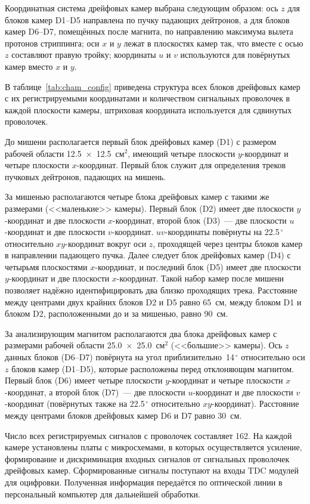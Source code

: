 Координатная система дрейфовых камер выбрана следующим образом: ось $z$ для
блоков камер D1--D5 направлена по пучку падающих дейтронов, а для блоков камер
D6--D7, помещённых после магнита, по направлению максимума вылета протонов
стриппинга; оси $x$ и $y$ лежат в плоскостях камер так, что вместе с осью $z$
составляют правую тройку; координаты $u$ и $v$ используются для повёрнутых камер
вместо $x$ и $y$.

В таблице~\ref{tab:cham_config} приведена структура всех блоков дрейфовых камер
с их регистрируемыми координатами и количеством сигнальных проволочек в каждой
плоскости камеры, штриховая координата используется для сдвинутых проволочек.


До мишени располагается первый блок дрейфовых камер (D1) с размером рабочей
области 12.5~$\times$~12.5~см$^2$, имеющий четыре плоскости $y$-координат и
четыре плоскости $x$-координат. Первый блок служит для определения треков
пучковых дейтронов, падающих на мишень.

За мишенью располагаются четыре блока дрейфовых камер с такими же размерами
(<<маленькие>> камеры). Первый блок (D2) имеет две плоскости $y$-координат и две
плоскости $x$-координат, второй блок (D3)~--- две плоскости $u$-координат и две
плоскости $v$-координат. $uv$-координаты повёрнуты на 22.5$^{\,\circ}$
относительно $xy$-координат вокруг оси $z$, проходящей через центры блоков камер
в направлении падающего пучка. Далее следует блок дрейфовых камер (D4) с
четырьмя плоскостями $x$-координат, и последний блок (D5) имеет две плоскости
$y$-координат и две плоскости $x$-координат. Такой набор камер после мишени
позволяет надёжно идентифицировать два близко проходящих трека. Расстояние между
центрами двух крайних блоков D2 и D5 равно 65~см, между блоком D1 и блоком D2,
расположенными до и за мишенью, равно 90~см.

За анализирующим магнитом располагаются два блока дрейфовых камер с размерами
рабочей области 25.0~$\times$~25.0~см$^2$ (<<большие>> камеры). Ось $z$ данных
блоков (D6--D7) повёрнута на угол приблизительно~14$^{\,\circ}$ относительно оси
$z$ блоков камер (D1--D5), которые расположены перед отклоняющим магнитом.
Первый блок (D6) имеет четыре плоскости $y$-координат и четыре плоскости
$x$-координат, а второй блок (D7)~--- две плоскости $u$-координат и две
плоскости $v$-координат (повёрнутых также на 22.5$^{\,\circ}$ относительно
$xy$-координат). Расстояние между центрами блоков дрейфовых камер D6 и D7 равно
30~см.

Число всех регистрируемых сигналов с проволочек составляет 162. На каждой камере
установлены платы с микросхемами, в которых осуществляется усиление,
формирование и дискриминация входных сигналов от сигнальных проволочек дрейфовых
камер. Сформированные сигналы поступают на входы TDC модулей для оцифровки.
Полученная информация передаётся по оптической линии в персональный компьютер
для дальнейшей обработки.

